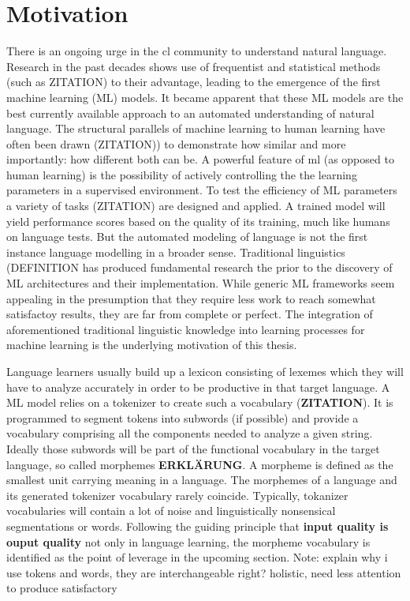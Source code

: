 \documentclass[english]{ttlab-qualify}
\begin{document}
    \section{Motivation}
    \label{sec:motivation}
    There is an ongoing urge in the \acf{cl} community to understand natural language.
    Research in the past decades shows use of frequentist and statistical methods (such as \uppercase{ZITATION}) to their advantage, leading to the emergence of the first machine learning (ML) models.
    It became apparent that these ML models are the best currently available approach to an automated understanding of natural language.
    The structural parallels of machine learning to human learning have often been drawn (\uppercase{zitation)}) to demonstrate how similar and more importantly: how different both can be.
    A powerful feature of \ac{ml} (as opposed to human learning) is the possibility of actively controlling the the learning parameters in a supervised environment.
    To test the efficiency of \uppercase{ML} parameters a variety of tasks (\uppercase{zitation}) are designed and applied.
    A trained model will yield performance scores based on the quality of its training, much like humans on language tests.
    But the automated modeling of language is not the first instance language modelling in a broader sense.
    Traditional linguistics (\uppercase{definition} has produced fundamental research the prior to the discovery of \uppercase{ML} architectures and their implementation.
    While generic ML frameworks seem appealing in the presumption that they require less work to reach somewhat satisfactoy results,
    they are far from complete or perfect.
    The integration of aforementioned traditional linguistic knowledge into learning processes for machine learning is the underlying motivation of this thesis.

    Language learners usually build up a lexicon consisting of lexemes which they will have to analyze accurately in order to be productive in that target language.
    A ML model relies on a tokenizer to create such a vocabulary  (\textbf{ZITATION}).
    It is programmed to segment tokens into subwords (if possible) and provide a vocabulary comprising all the components needed to analyze a given string.
    Ideally those subwords will be part of the functional vocabulary in the target language, so called morphemes \textbf{ERKLÄRUNG}.
    A morpheme is defined as the smallest unit carrying meaning in a language.
    The morphemes of a language and its generated tokenizer vocabulary rarely coincide.
    Typically, tokanizer vocabularies will contain a lot of noise and linguistically nonsensical segmentations or words.
    Following the guiding principle that \textbf{input quality is ouput quality} not only in language learning, the morpheme vocabulary is identified as the point of leverage in the upcoming section.
    Note: explain why i use tokens and words, they are interchangeable right?
    holistic, need less attention to produce satisfactory
    
\end{document}
